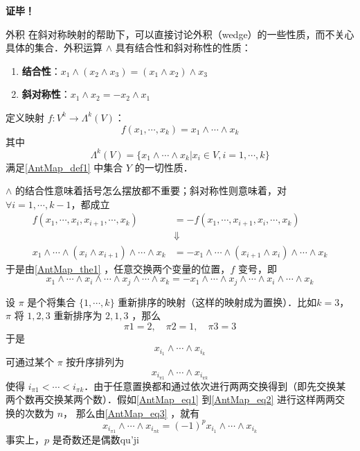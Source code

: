 \textbf{证毕！}
\begin{example}{外积}
在斜对称映射的帮助下，可以直接讨论外积（wedge）的一些性质，而不关心具体的集合．外积运算 $\wedge$ 具有结合性和斜对称性的性质：
\begin{enumerate}
\item \textbf{结合性}：$x_1\wedge(x_2\wedge x_3)=(x_1\wedge x_2)\wedge x_3$
\item \textbf{斜对称性}：$x_1\wedge x_2=-x_2\wedge x_1$
\end{enumerate}

定义映射 $f:V^k\rightarrow \Lambda^k(V)$：
\begin{equation}
f(x_1,\cdots,x_k)=x_1\wedge\cdots\wedge x_k
\end{equation}
其中
\begin{equation}
\Lambda^k(V)=\{x_1\wedge\cdots\wedge x_k| x_i\in V,i=1,\cdots,k\}
\end{equation}
满足\autoref{AntMap_def1} 中集合 $Y$ 的一切性质．

$\wedge$ 的结合性意味着括号怎么摆放都不重要；斜对称性则意味着，对 $\forall i=1,\cdots,k-1$，都成立
\begin{equation}
\begin{aligned}
f(x_1,\cdots,x_i,x_{i+1},\cdots,x_k)&=-f(x_1,\cdots,x_{i+1},x_i,\cdots,x_k)\\
&\Downarrow\\
x_1\wedge\cdots\wedge (x_i\wedge x_{i+1})\wedge\cdots\wedge x_k&=-x_1\wedge\cdots\wedge (x_{i+1}\wedge x_{i})\wedge\cdots\wedge x_k
\end{aligned}
\end{equation}
于是由\autoref{AntMap_the1} ，任意交换两个变量的位置，$f$ 变号，即
\begin{equation}
x_1\wedge\cdots\wedge x_i\wedge\cdots\wedge x_j\wedge\cdots\wedge x_k=-x_1\wedge\cdots\wedge x_j\wedge\cdots\wedge x_i\wedge\cdots\wedge x_k
\end{equation}

设 $\pi$ 是个将集合 $\{1,\cdots,k\}$ 重新排序的映射（这样的映射成为置换）．比如$k=3$， $\pi$ 将 $1,2,3$ 重新排序为 $2,1,3$ ，那么
\begin{equation}
\pi 1=2,\quad\pi2=1,\quad \pi3=3
\end{equation}
于是
\begin{equation}\label{AntMap_eq1}
x_{i_1}\wedge\cdots\wedge x_{i_k}
\end{equation}
可通过某个 $\pi$ 按升序排列为
\begin{equation}\label{AntMap_eq2}
x_{i_{\pi1}}\wedge\cdots\wedge x_{i_{\pi k}}
\end{equation}
使得 $i_{\pi1}<\cdots< i_{\pi k}$．由于任意置换都和通过依次进行两两交换得到（即先交换某两个数再交换某两个数）．假如\autoref{AntMap_eq1} 到\autoref{AntMap_eq2} 进行这样两两交换的次数为 $n$，
那么由\autoref{AntMap_eq3} ，就有
\begin{equation}
x_{i_{\pi1}}\wedge\cdots\wedge x_{i_{\pi k}}=(-1)^p x_{i_1}\wedge\cdots\wedge x_{i_k}
\end{equation}
事实上，$p$ 是奇数还是偶数qu'ji
\end{example}
